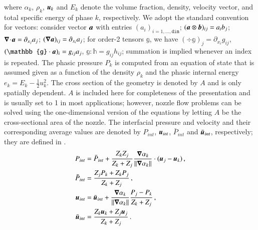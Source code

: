 \documentclass[preprint,10pt]{elsarticle}
\begin{document}
%
where $\alpha_k$, $\rho_k$, $\boldsymbol u_k$ and $E_k$ denote the volume fraction, density,  velocity vector, and total specific 
energy of phase $k$, respectively. We adopt the standard convention for vectors: consider vector $\boldsymbol a$ with entries $(a_i)_{i=1,\ldots,\texttt{dim}}$; $
(\boldsymbol a \otimes \boldsymbol b)_{ij}=a_i b_j$;
$\boldsymbol\nabla\! \cdot \! \boldsymbol a= \partial_{x_j} a_j$; $(\boldsymbol\nabla \boldsymbol a)_{ij} = \partial_{x_i} a_j$; for order-2 tensors $\mathbb{g}$, 
we have $(\div \mathbb{g})_j = \partial_{x_i} g_{ij}$, $(\mathbb{g}\cdot \mbold{a})_i = g_{ij}a_j$, 
$\mathbb{g}:\mathbb{h} = g_{ij} h_{ij}$; summation is implied whenever an index is repeated. 
The phasic pressure $P_k$ is computed from an equation of state that is assumed given as a function of the density $\rho_k$ and 
the phasic internal energy $e_k = E_k - \tfrac{1}{2} u^2_k$. The cross section of the geometry is denoted by $A$ and is only 
spatially dependent. $A$ is included here for completeness of the presentation and is usually set to 1 in most applications; however, 
nozzle flow problems can be solved using the one-dimensional version of the equations by letting $A$ be the cross-sectional area 
of the nozzle. 
The interfacial pressure and velocity and their corresponding average values are denoted by $P_{int}$, $\boldsymbol u_{int}$, 
$\bar{P}_{int}$ and $\bar{\boldsymbol u}_{int}$, respectively; they are defined in .
%
\begin{subequations}
\label{eq:int_variables_def}
\begin{align}
  \label{E-R:83}
  P_{int} &= \bar{P}_{int} + \frac{Z_{k}Z_{j}}{Z_{k}+Z_{j}} \frac{\boldsymbol\nabla \alpha_{k}}{|| \boldsymbol\nabla \alpha_{k} ||} \cdot (\boldsymbol u_{j}-\boldsymbol u_{k}) \,,
  \\
  \bar{P}_{int} &= \frac{Z_{j}P_{k}+Z_{k}P_{j}}{Z_{k}+Z_{j}} \,,
 \\
  \label{E-R:84}
  \boldsymbol u_{int} &= \bar{\boldsymbol u}_{int} +  \frac{\boldsymbol\nabla \alpha_{k}}{|| \boldsymbol\nabla \alpha_{k} ||} \frac{P_{j}-P_{k}}{Z_{k}+Z_{j}} \,,
  \\
  \bar{\boldsymbol u}_{int} &= \frac{Z_{k} \boldsymbol u_{k}+Z_{j}\boldsymbol u_{j}}{Z_{k}+Z_{j}} \,.
\end{align}
\end{subequations}
%
\end{document}
